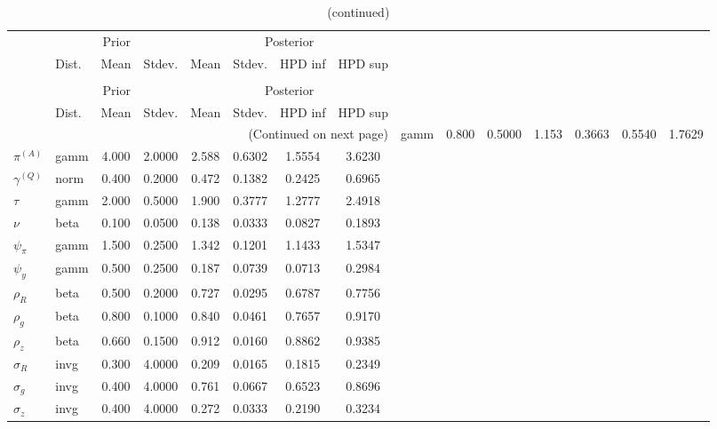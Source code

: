  
\begin{center}
\begin{longtable}{llcccccc} 
\caption{Results from Metropolis-Hastings (parameters)}
 \label{Table:MHPosterior:1}\\
\toprule 
  & \multicolumn{3}{c}{Prior}  &  \multicolumn{4}{c}{Posterior} \\
  \cmidrule(r{.75em}){2-4} \cmidrule(r{.75em}){5-8}
  & Dist. & Mean  & Stdev. & Mean & Stdev. & HPD inf & HPD sup\\
\midrule \endfirsthead 
\caption{(continued)}\\\toprule 
  & \multicolumn{3}{c}{Prior}  &  \multicolumn{4}{c}{Posterior} \\
  \cmidrule(r{.75em}){2-4} \cmidrule(r{.75em}){5-8}
  & Dist. & Mean  & Stdev. & Mean & Stdev. & HPD inf & HPD sup\\
\midrule \endhead 
\bottomrule \multicolumn{8}{r}{(Continued on next page)} \endfoot 
\bottomrule \endlastfoot 
${r_{A}}$ & gamm &   0.800 & 0.5000 &   1.153& 0.3663 &  0.5540 &  1.7629 \\ 
${\pi^{(A)}}$ & gamm &   4.000 & 2.0000 &   2.588& 0.6302 &  1.5554 &  3.6230 \\ 
${\gamma^{(Q)}}$ & norm &   0.400 & 0.2000 &   0.472& 0.1382 &  0.2425 &  0.6965 \\ 
${\tau}$ & gamm &   2.000 & 0.5000 &   1.900& 0.3777 &  1.2777 &  2.4918 \\ 
${\nu}$ & beta &   0.100 & 0.0500 &   0.138& 0.0333 &  0.0827 &  0.1893 \\ 
${\psi_\pi}$ & gamm &   1.500 & 0.2500 &   1.342& 0.1201 &  1.1433 &  1.5347 \\ 
${\psi_y}$ & gamm &   0.500 & 0.2500 &   0.187& 0.0739 &  0.0713 &  0.2984 \\ 
${\rho_R}$ & beta &   0.500 & 0.2000 &   0.727& 0.0295 &  0.6787 &  0.7756 \\ 
${\rho_{g}}$ & beta &   0.800 & 0.1000 &   0.840& 0.0461 &  0.7657 &  0.9170 \\ 
${\rho_z}$ & beta &   0.660 & 0.1500 &   0.912& 0.0160 &  0.8862 &  0.9385 \\ 
${\sigma_R}$ & invg &   0.300 & 4.0000 &   0.209& 0.0165 &  0.1815 &  0.2349 \\ 
${\sigma_{g}}$ & invg &   0.400 & 4.0000 &   0.761& 0.0667 &  0.6523 &  0.8696 \\ 
${\sigma_z}$ & invg &   0.400 & 4.0000 &   0.272& 0.0333 &  0.2190 &  0.3234 \\ 
\end{longtable}
 \end{center}
